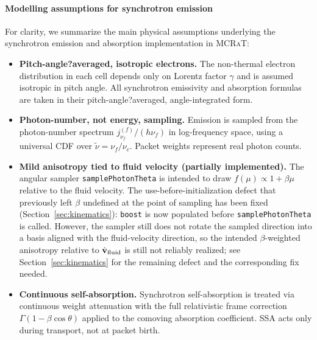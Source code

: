 \documentclass[12pt,a4paper]{article}
\newcommand{\nuth}{\tilde{\nu}}
\newcommand{\nuf}{\nu_{\!f}}
\newcommand{\nuc}{\nu_c}
\newcommand{\code}[1]{\texttt{#1}}
\newcommand{\mcrat}{\textsc{MCRaT}}
\begin{document}
\paragraph{Modelling assumptions for synchrotron emission}
\label{sec:assumptions}

For clarity, we summarize the main physical assumptions underlying the
synchrotron emission and absorption implementation in \mcrat{}:

\begin{itemize}
	\item \textbf{Pitch-angle?averaged, isotropic electrons.}
	The non-thermal electron distribution in each cell depends only on
	Lorentz factor \(\gamma\) and is assumed isotropic in pitch angle.
	All synchrotron emissivity and absorption formulas are taken in
	their pitch-angle?averaged, angle-integrated form.
	
	\item \textbf{Photon-number, not energy, sampling.}
	Emission is sampled from the photon-number spectrum
	\(j_{\nuf}^{(f)}/(h\nuf)\) in log-frequency space, using a universal
	CDF over \(\nuth = \nuf/\nuc\). Packet weights represent real photon
	counts.
	
	\item \textbf{Mild anisotropy tied to fluid velocity (partially
		implemented).} The angular sampler \code{samplePhotonTheta} is
	intended to draw $f(\mu)\propto1+\beta\mu$ relative to the fluid
	velocity. The use-before-initialization defect that previously
	left $\beta$ undefined at the point of sampling has been fixed
	(Section~\ref{sec:kinematics}): \code{boost} is now populated
	before \code{samplePhotonTheta} is called. However, the sampler
	still does not rotate the sampled direction into a basis aligned
	with the fluid-velocity direction, so the intended
	$\beta$-weighted anisotropy relative to $\hat{\mathbf
		v}_{\rm fluid}$ is still not reliably realized; see
	Section~\ref{sec:kinematics} for the remaining defect and the
	corresponding fix needed.
	
	\item \textbf{Continuous self-absorption.}
	Synchrotron self-absorption is treated via continuous weight
	attenuation with the full relativistic frame correction
	\(\Gamma(1-\beta\cos\theta)\) applied to the comoving absorption
	coefficient. SSA acts only during transport, not at packet birth.
	

\end{itemize}
\end{document}
